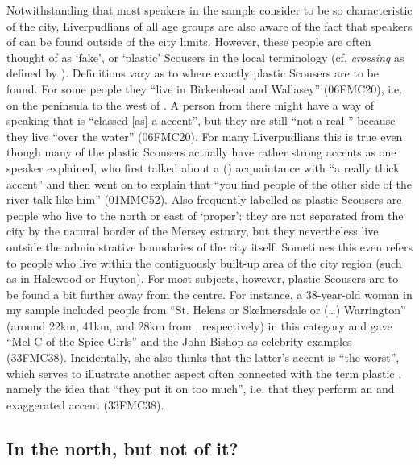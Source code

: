 Notwithstanding that most speakers in the sample consider  to be so characteristic of the city, Liverpudlians of all age groups are also aware of the fact that speakers of  can be found outside of the city limits.
However, these people are often thought of as `fake', or `plastic' Scousers in the local terminology (cf. \emph{crossing} as defined by \citealt{rampton1995}).
Definitions vary as to where exactly plastic Scousers are to be found.
For some people they ``live in Birkenhead and Wallasey'' (06FMC20), i.e. on the  peninsula to the west of .
A person from there might have a way of speaking that is ``classed [as] a  accent'', but they are still ``not a real '' because they live ``over the water'' (06FMC20).
For many Liverpudlians this is true even though many of the plastic Scousers actually have rather strong  accents as one speaker explained, who first talked about a () acquaintance with ``a really thick accent'' and then went on to explain that ``you find people of the other side of the river talk like him'' (01MMC52).
Also frequently labelled as plastic Scousers are people who live to the north or east of  `proper': they are not separated from the city by the natural border of the Mersey estuary, but they nevertheless live outside the administrative boundaries of the city itself.
Sometimes this even refers to people who live within the contiguously built-up area of the  city region (such as in Halewood or Huyton).
For most subjects, however, plastic Scousers are to be found a bit further away from the centre.
For instance, a 38-year-old woman in my sample included people from ``St. Helens or Skelmersdale or (\ldots) Warrington'' (around 22km, 41km, and 28km from , respectively) in this category and gave ``Mel C of the Spice Girls'' and the  John Bishop as celebrity examples (33FMC38).
Incidentally, she also thinks that the latter's accent is ``the worst'', which serves to illustrate another aspect often connected with the term plastic , namely the idea that ``they put it on too much'', i.e. that they perform an  and exaggerated  accent (33FMC38).

\subsection{In the north, but not of it?}
\label{aware_res.north}

